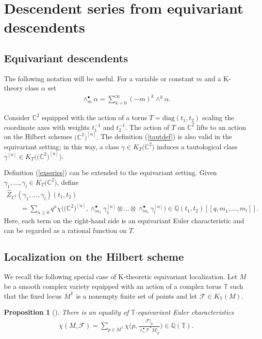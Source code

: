 \documentclass[pdftex]{sigma}
\newtheorem{Proposition}[Theorem]{Proposition}
 { \theoremstyle{definition}
\newtheorem{Definition}[Theorem]{Definition}
\newtheorem{Note}[Theorem]{Note}
\newtheorem{Example}[Theorem]{Example}
\newtheorem{Remark}[Theorem]{Remark} }
\numberwithin{equation}{section}
\def\C{\mathbb C}
\def\Q{\mathbb Q}
\begin{document}
\section{Descendent series from equivariant descendents}\label{C2togen}

\subsection{Equivariant descendents}
The following notation will be useful. For a variable or constant $m$ and a K-theory class $\alpha$ set \begin{gather*}
\wedge_{m}^{\bullet}\alpha=\sum_{k=0}^{\infty} (-m)^k \wedge^k \alpha.
\end{gather*}

Consider $\C^2$ equipped with the action of a torus $T=\mathrm{diag}(t_1,t_2)$ scaling the coordinate axes with weights $t_1^{-1}$ and $t_2^{-1}$. The action of $T$ on $\C^2$ lifts to an action on the Hilbert schemes $\big(\C^2\big)^{[n]}.$ The definition (\ref{tautdef}) is also valid in the equivariant setting; in this way, a class $\gamma\in K_T\big(\C^2\big)$ induces a tautological class $\gamma^{[n]} \in K_T\big(\big(\C^2\big)^{[n]}\big)$.

Definition (\ref{exseries}) can be extended to the equivariant setting. Given $\gamma_1,\dots,\gamma_l\in K_T\big(\C^2\big)$, define
\begin{gather*}
\hat{Z}_{\C^2}(\gamma_1,\dots,\gamma_l)(t_1,t_2)
\\ \qquad
{}=\sum_{n\geq 0} q^{n} \chi\big(\big(\C^2\big)^{[n]}, \wedge^{\bullet}_{m_1} \gamma^{[n]}_1 \otimes \dots \otimes \wedge^{\bullet}_{m_l} \gamma_l^{[n]} \big)\in \Q(t_1,t_2)[[q,m_1,\dots,m_l]].
\end{gather*}
Here, each term on the right-hand side is an equivariant Euler characteristic and can be regarded as a rational function on $T$.


\subsection{Localization on the Hilbert scheme}
We recall the following special case of K-theoretic equivariant localization. Let $M$ be a smooth complex variety equipped with an action of a complex torus $\mathbb{T}$ such that the fixed locus $M^{\mathbb{T}}$ is a nonempty finite set of points and let $\mathscr{F}\in K_{\mathbb{T}}(M)$.

\begin{Proposition}[{\cite[Theorem~3.5]{T}}]
There is an equality of $\mathbb{T}$-equivariant Euler characteristics
\begin{gather}\label{Keq}
\chi(M,\mathscr{F})=\sum_{p\in M^{\mathbb{T}}} \chi\bigg(p,\frac{\mathscr{F}|_{p}}{\wedge^{\bullet}_1 \mathcal{T}^{*}M|_p} \bigg) \in \Q(\mathbb{T}).
\end{gather}
\end{Proposition}
\end{document}
